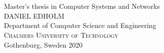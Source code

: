 
\begin{titlepage}
			
\addtolength{\voffset}{2cm}


\mbox{}
\vfill
\renewcommand{\familydefault}{\sfdefault} \normalfont %
\textbf{{\Huge 	\THETITLE}} 	\\[0.5cm]
{\Large \TITLEDESCR }\\[0.5cm]
Master's thesis in Computer Systems and Networks \\[0.5cm]

{\Large DANIEL EDHOLM}\\[2.5cm]

Department of Computer Science and Engineering \\
\textsc{Chalmers University of Technology} \\
Gothenburg, Sweden 2020

\renewcommand{\familydefault}{\rmdefault} \normalfont %
\end{titlepage}


\newpage
\restoregeometry
\thispagestyle{empty}
\mbox{}


